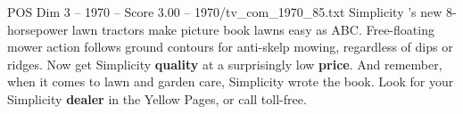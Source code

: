 \begin{textsample}{POS Dim 3 – 1970 – Score 3.00 – 1970/tv\_com\_1970\_85.txt}  \label{ex:f3_pos_035}
Simplicity 's new 8-horsepower lawn tractors make picture book lawns easy as ABC.
Free-floating mower action follows ground contours for anti-skelp mowing, regardless of dips or ridges.
Now get Simplicity \textbf{quality} at a surprisingly low \textbf{price}.
And remember, when it comes to lawn and garden care, Simplicity wrote the book.
Look for your Simplicity \textbf{dealer} in the Yellow Pages, or call toll-free.

\end{textsample}
